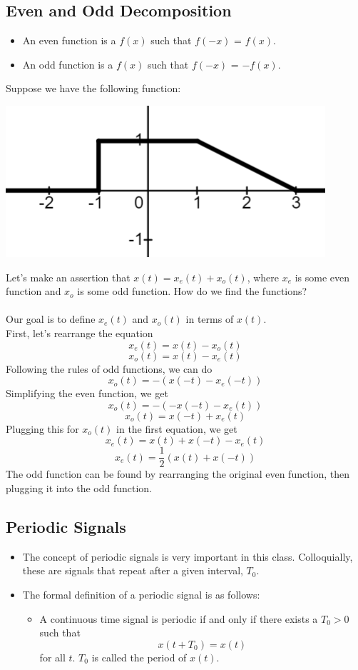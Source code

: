 \documentclass[10pt]{article}
\begin{document}
\subsection*{Even and Odd Decomposition}
\begin{itemize}
    \item An even function is a $f(x)$ such that $f(-x)$ = $f(x)$.
    \item An odd function is a $f(x)$ such that $f(-x)$ = $-f(x)$.
\end{itemize}
Suppose we have the following function:
\begin{center}
    \includegraphics[scale=1]{W1_3.png}
\end{center}
Let's make an assertion that $x(t) = x_e(t) + x_o(t)$, where $x_e$ is some even function and $x_o$ is some odd function.  How do we find the functions?\\\\
Our goal is to define $x_e(t)$ and $x_o(t)$ in terms of $x(t)$.\\
First, let's rearrange the equation
\[x_e(t) = x(t) - x_o(t)\]
\[x_o(t) = x(t) - x_e(t)\]
Following the rules of odd functions, we can do
\[x_o(t) = -(x(-t) - x_e(-t))\]
Simplifying the even function, we get 
\[x_o(t) = -(-x(-t) - x_e(t))\]
\[x_o(t) = x(-t) + x_e(t)\]
Plugging this for $x_o(t)$ in the first equation, we get
\[x_e(t) = x(t) + x(-t) - x_e(t)\]
\[\boxed{x_e(t) = \frac{1}{2}\left(x(t) + x(-t)\right)}\]
The odd function can be found by rearranging the original even function, then plugging it into the odd function.
\subsection*{Periodic Signals}
\begin{itemize}
    \item The concept of periodic signals is very important in this class.  Colloquially, these are signals that repeat after a given interval, $T_0$.
    \item The formal definition of a periodic signal is as follows:
    \begin{itemize}
        \item A continuous time signal is periodic if and only if there exists a $T_0 > 0$ such that
        \[x(t + T_0) = x(t)\]
            for all $t$.  $T_0$ is called the period of $x(t)$.
    \end{itemize}
\end{itemize}
\end{document}
